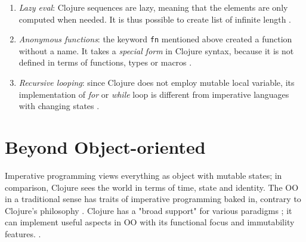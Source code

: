 \documentclass[12pt]{article}
\begin{document}
\begin{enumerate}
\item {\it Lazy eval}: Clojure sequences are lazy, meaning that the elements are only computed when needed. It is thus possible to create list of infinite length \cite{rathore2011clojure}. 

\item {\it Anonymous functions}: the keyword \texttt{fn} mentioned above created a function without a name. It takes a {\it special form} in Clojure syntax, because it is not defined in terms of functions, types or macros \cite{fogus2014joy}.


\item {\it Recursive looping}: since Clojure does not employ mutable local variable, its implementation of {\it for} or {\it while} loop is different from imperative languages with changing states \cite{clojurefn}.



\end{enumerate}

\part{Beyond Object-oriented}

Imperative programming views everything as object with mutable states; in comparison, Clojure sees the world in terms of time, state and identity. The OO in a traditional sense has traits of imperative programming baked in, contrary to Clojure's philosophy \cite{fogus2014joy}. Clojure has a "broad support" for various paradigms \cite{rathore2011clojure}; it can implement useful aspects in OO with its functional focus and immutability features. \cite{fogus2014joy}.
\end{document}
